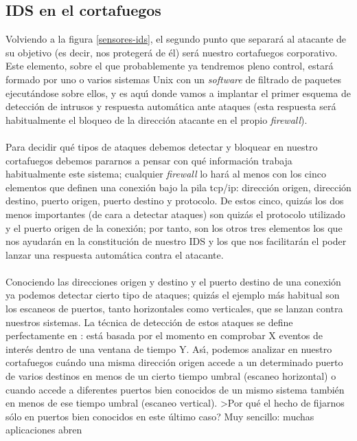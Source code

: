 \subsection{IDS en el cortafuegos}
Volviendo a la figura \ref{sensores-ids}, el segundo punto que separar\'a al 
atacante de 
su objetivo (es decir, nos proteger\'a de \'el) ser\'a nuestro cortafuegos 
corporativo. Este elemento, sobre el que probablemente ya tendremos pleno 
control, estar\'a formado por uno o varios sistemas Unix con un {\it software}
de filtrado de paquetes ejecut\'andose sobre ellos, y es aqu\'{\i} donde vamos
a implantar el primer esquema de detecci\'on de intrusos y respuesta 
autom\'atica ante ataques (esta respuesta ser\'a habitualmente el bloqueo de
la direcci\'on atacante en el propio {\it firewall}).\\
\\Para decidir qu\'e tipos de ataques debemos detectar y bloquear en nuestro
cortafuegos debemos pararnos a pensar con qu\'e informaci\'on trabaja 
habitualmente este sistema; cualquier {\it firewall} lo har\'a al menos con
los cinco elementos que definen una conexi\'on bajo la pila {\sc tcp/ip}: 
direcci\'on origen, direcci\'on destino, puerto origen, puerto destino y
protocolo. De estos cinco, quiz\'as los dos menos importantes (de cara a 
detectar ataques) son quiz\'as el protocolo utilizado y el puerto origen de la
conexi\'on; por tanto, son los otros tres elementos los que nos ayudar\'an en
la constituci\'on de nuestro IDS y los que nos facilitar\'an el poder lanzar
una respuesta autom\'atica contra el atacante.\\
\\Conociendo las direcciones origen y destino y el puerto destino de una 
conexi\'on ya podemos detectar cierto tipo de ataques; quiz\'as el ejemplo
m\'as habitual son los escaneos de puertos, tanto horizontales como verticales,
que se lanzan contra nuestros sistemas. La t\'ecnica de detecci\'on de estos 
ataques se define perfectamente en \cite{kn:nor99}: est\'a basada por el 
momento en comprobar X eventos de inter\'es dentro de una ventana de tiempo Y.
As\'{\i}, podemos analizar en nuestro cortafuegos cu\'ando una misma 
direcci\'on origen accede a un determinado puerto de varios destinos en menos de
un cierto tiempo umbral (escaneo horizontal) o cuando accede a diferentes 
puertos bien conocidos de un mismo sistema tambi\'en en menos de ese tiempo 
umbral (escaneo vertical). >Por qu\'e el hecho de fijarnos s\'olo en puertos
bien conocidos en este \'ultimo caso? Muy sencillo: muchas aplicaciones abren
